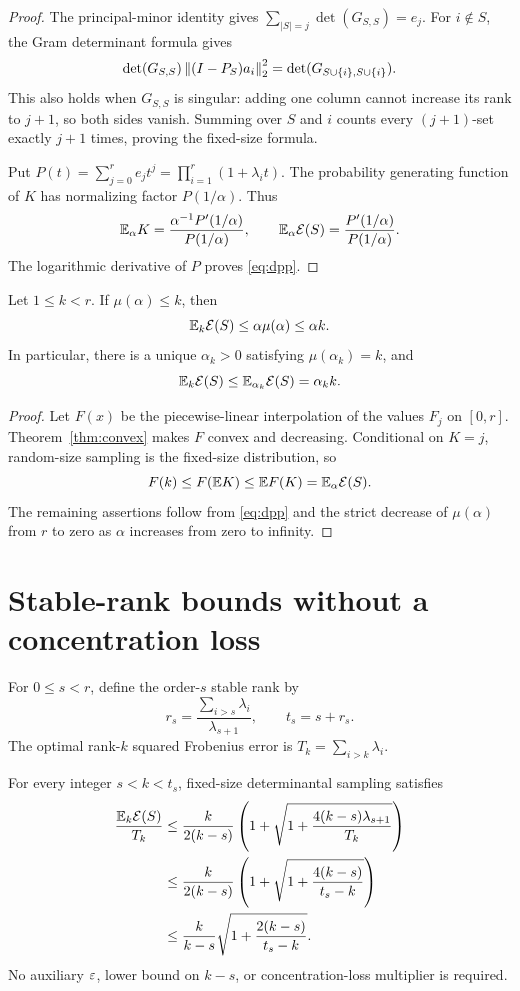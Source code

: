 \documentclass[11pt]{article}
\begin{document}
\begin{proof}
The principal-minor identity gives
$\sum_{|S|=j}\det(G_{S,S})=e_j$.
For $i\notin S$, the Gram determinant formula gives
\[
 \det(G_{S,S})\left\lVert(I-P_S)a_i\right\rVert_2^2
       =\det(G_{S\cup\{i\},S\cup\{i\}}).
\]
This also holds when $G_{S,S}$ is singular: adding one column cannot increase its rank to $j+1$, so both sides vanish. Summing over $S$ and $i$ counts every $(j+1)$-set exactly $j+1$ times, proving the fixed-size formula.

Put $P(t)=\sum_{j=0}^r e_jt^j=\prod_{i=1}^r(1+\lambda_i t)$. The probability generating function of $K$ has normalizing factor $P(1/\alpha)$. Thus
\[
 \mathbb E_\alpha K=\frac{\alpha^{-1}P'(1/\alpha)}{P(1/\alpha)},\qquad
 \mathbb E_\alpha\mathcal E(S)=\frac{P'(1/\alpha)}{P(1/\alpha)}.
\]
The logarithmic derivative of $P$ proves \eqref{eq:dpp}.
\end{proof}

\begin{corollary}\label{cor:jensen}
Let $1\le k<r$. If $\mu(\alpha)\le k$, then
\[
 \mathbb E_k\mathcal E(S)\le\alpha\mu(\alpha)\le\alpha k.
\]
In particular, there is a unique $\alpha_k>0$ satisfying $\mu(\alpha_k)=k$, and
\[
 \mathbb E_k\mathcal E(S)\le\mathbb E_{\alpha_k}\mathcal E(S)=\alpha_k k.
\]
\end{corollary}

\begin{proof}
Let $F(x)$ be the piecewise-linear interpolation of the values $F_j$ on $[0,r]$. Theorem~\ref{thm:convex} makes $F$ convex and decreasing. Conditional on $K=j$, random-size sampling is the fixed-size distribution, so
\[
 F(k)\le F(\mathbb E K)\le\mathbb E F(K)=\mathbb E_\alpha\mathcal E(S).
\]
The remaining assertions follow from \eqref{eq:dpp} and the strict decrease of $\mu(\alpha)$ from $r$ to zero as $\alpha$ increases from zero to infinity.
\end{proof}

\section{Stable-rank bounds without a concentration loss}
For $0\le s<r$, define the order-$s$ stable rank by
\[
 r_s=\frac{\sum_{i>s}\lambda_i}{\lambda_{s+1}},\qquad t_s=s+r_s.
\]
The optimal rank-$k$ squared Frobenius error is
$T_k=\sum_{i>k}\lambda_i$.

\begin{theorem}\label{thm:stable}
For every integer $s<k<t_s$, fixed-size determinantal sampling satisfies
\begin{align}
 \frac{\mathbb E_k\mathcal E(S)}{T_k}
 &\le \frac{k}{2(k-s)}
      \left(1+\sqrt{1+\frac{4(k-s)\lambda_{s+1}}{T_k}}\right)\label{eq:directbound}\\
 &\le \frac{k}{2(k-s)}
      \left(1+\sqrt{1+\frac{4(k-s)}{t_s-k}}\right)\label{eq:stablebound}\\
 &\le \frac{k}{k-s}\sqrt{1+\frac{2(k-s)}{t_s-k}}.\label{eq:oldphi}
\end{align}
No auxiliary $\varepsilon$, lower bound on $k-s$, or concentration-loss multiplier is required.
\end{theorem}
\end{document}
